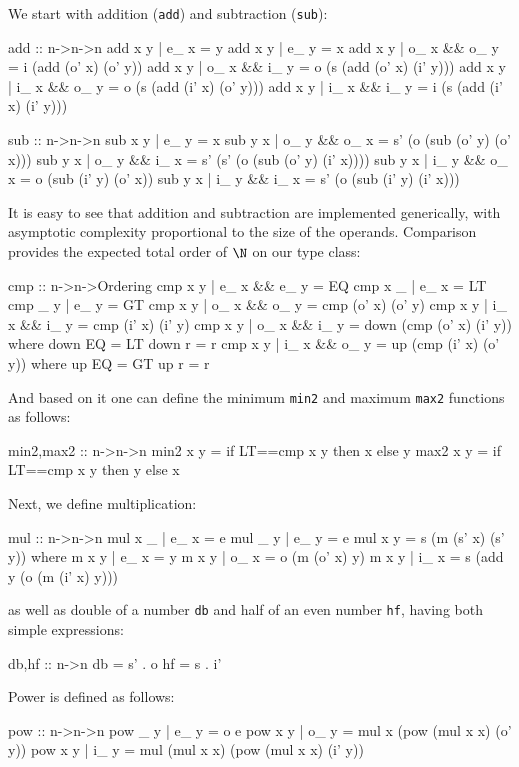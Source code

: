 \documentclass{TOOLS/llncs}
\begin{document}
We start with addition ({\tt add}) and subtraction ({\tt sub}):
\begin{code} 
  add :: n->n->n
  add x y | e_ x = y
  add x y | e_ y  = x
  add x y | o_ x && o_ y = i (add (o' x) (o' y))
  add x y | o_ x && i_ y = o (s (add (o' x) (i' y)))
  add x y | i_ x && o_ y = o (s (add (i' x) (o' y)))
  add x y | i_ x && i_ y = i (s (add (i' x) (i' y)))
  
  sub :: n->n->n
  sub x y | e_ y = x
  sub y x | o_ y && o_ x = s' (o (sub (o' y) (o' x))) 
  sub y x | o_ y && i_ x = s' (s' (o (sub (o' y) (i' x))))
  sub y x | i_ y && o_ x = o (sub (i' y) (o' x))  
  sub y x | i_ y && i_ x = s' (o (sub (i' y) (i' x))) 
\end{code}
It is easy to see that addition  and subtraction  are
implemented generically, with asymptotic complexity proportional 
to the size of the operands.
Comparison provides the expected total order of $\N$ on our type class:
\begin{code}
  cmp :: n->n->Ordering
  cmp x y | e_ x && e_ y = EQ
  cmp x _ | e_ x = LT
  cmp _ y | e_ y = GT
  cmp x y | o_ x && o_ y = cmp (o' x) (o' y)
  cmp x y | i_ x && i_ y = cmp (i' x) (i' y)
  cmp x y | o_ x && i_ y = down (cmp (o' x) (i' y)) where
    down EQ = LT
    down r = r
  cmp x y | i_ x && o_ y = up (cmp (i' x) (o' y)) where
    up EQ = GT
    up r = r
\end{code}
And based on it one can define the minimum {\tt min2} and maximum 
{\tt max2} functions as follows:
\begin{code}
  min2,max2 :: n->n->n
  min2 x y = if LT==cmp x y then x else y
  max2 x y = if LT==cmp x y then y else x
\end{code}
Next, we define multiplication:
\begin{code}
  mul :: n->n->n
  mul x _ | e_ x = e
  mul _ y | e_ y = e
  mul x y = s (m (s' x) (s' y)) where
    m x y | e_ x = y
    m x y | o_ x = o (m (o' x) y)
    m x y | i_ x = s (add y  (o (m (i' x) y)))
\end{code}
as well as double of a number {\tt db} and %
half of an even number {\tt hf},
having both simple expressions:
\begin{code}  
  db,hf :: n->n 
  db = s' . o
  hf = s . i'
\end{code}
Power is defined as follows:
\begin{code}
  pow :: n->n->n
  pow _ y | e_ y = o e
  pow x y | o_ y = mul x (pow (mul x x) (o' y))
  pow x y | i_ y = mul (mul x x) (pow (mul x x) (i' y)) 
\end{code}
\end{document}
